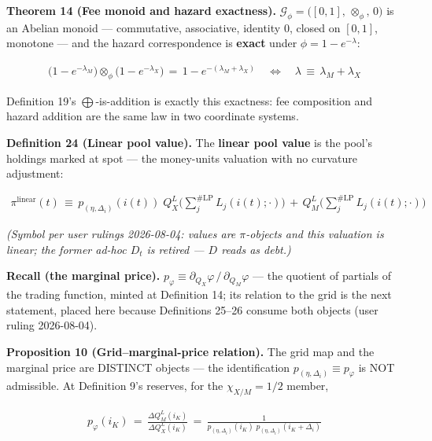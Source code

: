 \documentclass[11pt]{article}
\renewcommand{\_}{\textunderscore\allowbreak}
\begin{document}
\textbf{Theorem 14 (Fee monoid and hazard exactness).} \(\mathcal{G}_{\phi} = \big([0,1],\, \otimes_{\phi},\, 0\big)\) is an Abelian monoid --- commutative, associative, identity \(0\), closed on \([0,1]\), monotone --- and the hazard correspondence is \textbf{exact} under \(\phi = 1 - e^{-\lambda}\):

\[
    \begin{aligned}
        \big(1-e^{-\lambda_M}\big) \otimes_{\phi} \big(1-e^{-\lambda_X}\big) \, = \, 1-e^{-(\lambda_M+\lambda_X)}
        \quad\Longleftrightarrow\quad \lambda \, \equiv \, \lambda_M + \lambda_X
    \end{aligned}
\]

Definition 19's \(\bigoplus\)-is-addition is exactly this exactness: fee composition and hazard addition are the same law in two coordinate systems.

\textbf{Definition 24 (Linear pool value).} The \textbf{linear pool value} is the pool's holdings marked at spot --- the money-units valuation with no curvature adjustment:

\[
    \begin{aligned}
        \pi^{\text{linear}}(t) \, \equiv \, p_{(\eta,\Delta_i)}(i(t))\; Q_X^L\Big(\textstyle\sum_j^{\#\text{LP}} L_j(i(t);\cdot)\Big) \, + \, Q_M^L\Big(\textstyle\sum_j^{\#\text{LP}} L_j(i(t);\cdot)\Big)
    \end{aligned}
\]

\emph{(Symbol per user rulings 2026-08-04: values are \(\pi\)-objects and this valuation is linear; the former ad-hoc \(D_t\) is retired --- \(D\) reads as debt.)}

\textbf{Recall (the marginal price).} \(p_{\varphi} \equiv \partial_{Q_X}\varphi \,/\, \partial_{Q_M}\varphi\) --- the quotient of partials of the trading function, minted at Definition 14; its relation to the grid is the next statement, placed here because Definitions 25--26 consume both objects (user ruling 2026-08-04).

\textbf{Proposition 10 (Grid--marginal-price relation).} The grid map and the marginal price are DISTINCT objects --- the identification \(p_{(\eta,\Delta_i)} \equiv p_{\varphi}\) is NOT admissible. At Definition 9's reserves, for the \(\chi_{X/M} = 1/2\) member,

\[
    \begin{aligned}
        p_{\varphi}(i_K) \, = \, \frac{\Delta Q_M^L(i_K)}{\Delta Q_X^L(i_K)} \, = \, \frac{1}{p_{(\eta,\Delta_i)}(i_K)\; p_{(\eta,\Delta_i)}(i_K+\Delta_i)}
    \end{aligned}
\]
\end{document}
